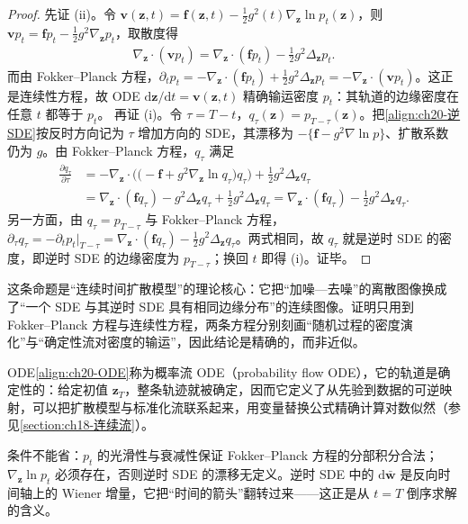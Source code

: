 \documentclass[../../main.tex]{subfiles}
\begin{document}
\begin{proof}
先证 (ii)。令 $\bm{v}(\bm{z},t)=\bm{f}(\bm{z},t)-\frac{1}{2}g^2(t)\nabla_{\bm{z}}\ln p_t(\bm{z})$，则 $\bm{v}p_t=\bm{f}p_t-\frac{1}{2}g^2\nabla_{\bm{z}}p_t$，取散度得
\begin{align*}
\nabla_{\bm{z}}\cdot(\bm{v}p_t)=\nabla_{\bm{z}}\cdot(\bm{f}p_t)-\frac{1}{2}g^2\Delta_{\bm{z}}p_t.
\end{align*}
而由 Fokker--Planck 方程，$\partial_tp_t=-\nabla_{\bm{z}}\cdot(\bm{f}p_t)+\frac{1}{2}g^2\Delta_{\bm{z}}p_t=-\nabla_{\bm{z}}\cdot(\bm{v}p_t)$。这正是连续性方程，故 ODE $\mathrm{d}\bm{z}/\mathrm{d}t=\bm{v}(\bm{z},t)$ 精确输运密度 $p_t$：其轨道的边缘密度在任意 $t$ 都等于 $p_t$。
再证 (i)。令 $\tau=T-t$，$q_{\tau}(\bm{z})=p_{T-\tau}(\bm{z})$。把\eqref{align:ch20-逆SDE}按反时方向记为 $\tau$ 增加方向的 SDE，其漂移为 $-\big\{\bm{f}-g^2\nabla\ln p\big\}$、扩散系数仍为 $g$。由 Fokker--Planck 方程，$q_{\tau}$ 满足
\begin{align*}
\frac{\partial q_{\tau}}{\partial\tau}&=-\nabla_{\bm{z}}\cdot\Big(\big(-\bm{f}+g^2\nabla_{\bm{z}}\ln q_{\tau}\big)q_{\tau}\Big)+\frac{1}{2}g^2\Delta_{\bm{z}}q_{\tau}\\
&=\nabla_{\bm{z}}\cdot(\bm{f}q_{\tau})-g^2\Delta_{\bm{z}}q_{\tau}+\frac{1}{2}g^2\Delta_{\bm{z}}q_{\tau}=\nabla_{\bm{z}}\cdot(\bm{f}q_{\tau})-\frac{1}{2}g^2\Delta_{\bm{z}}q_{\tau}.
\end{align*}
另一方面，由 $q_{\tau}=p_{T-\tau}$ 与 Fokker--Planck 方程，$\partial_{\tau}q_{\tau}=-\partial_tp_t|_{T-\tau}=\nabla_{\bm{z}}\cdot(\bm{f}q_{\tau})-\frac{1}{2}g^2\Delta_{\bm{z}}q_{\tau}$。两式相同，故 $q_{\tau}$ 就是逆时 SDE 的密度，即逆时 SDE 的边缘密度为 $p_{T-\tau}$；换回 $t$ 即得 (i)。证毕。
\end{proof}

\begin{remark}
这条命题是“连续时间扩散模型”的理论核心：它把“加噪—去噪”的离散图像换成了“一个 SDE 与其逆时 SDE 具有相同边缘分布”的连续图像。证明只用到 Fokker--Planck 方程与连续性方程，两条方程分别刻画“随机过程的密度演化”与“确定性流对密度的输运”，因此结论是精确的，而非近似。\par
ODE\eqref{align:ch20-ODE}称为概率流 ODE（probability flow ODE），它的轨道是确定性的：给定初值 $\bm{z}_T$，整条轨迹就被确定，因而它定义了从先验到数据的可逆映射，可以把扩散模型与标准化流联系起来，用变量替换公式精确计算对数似然（参见\cref{section:ch18-连续流}）。\par
条件不能省：$p_t$ 的光滑性与衰减性保证 Fokker--Planck 方程的分部积分合法；$\nabla_{\bm{z}}\ln p_t$ 必须存在，否则逆时 SDE 的漂移无定义。逆时 SDE 中的 $\mathrm{d}\bar{\bm{w}}$ 是反向时间轴上的 Wiener 增量，它把“时间的箭头”翻转过来——这正是从 $t=T$ 倒序求解的含义。
\end{remark}
\end{document}

